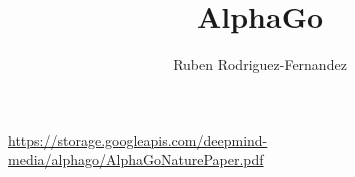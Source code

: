 \documentclass[10pt,a4paper]{article}
\title{AlphaGo}
\author{Ruben Rodriguez-Fernandez}
\begin{document}
\maketitle


\begin{thebibliography}{9}
 \url{https://storage.googleapis.com/deepmind-media/alphago/AlphaGoNaturePaper.pdf}
\end{thebibliography}
\end{document}

